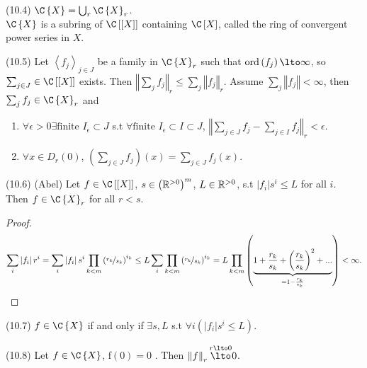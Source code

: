 \begin{definition*}
(10.4) $\C\left\{ X\right\} =\bigcup_{r}\C\left\{ X\right\} _{r}$.\\
$\C\left\{ X\right\} $ is a subring of $\C\left[\left[X\right]\right]$
containing $\C\left[X\right]$, called the ring of convergent power
series in $X$.\end{definition*}
\begin{exercise*}
(10.5) Let $\left\langle f_{j}\right\rangle _{j\in J}$ be a family
in $\C\left\{ X\right\} _{r}$ such that $\mathrm{ord}\left(f_{j}\right)\lto\infty$,
so $\sum_{j\in J}\in\C\left[\left[X\right]\right]$ exists. Then $\left\Vert \sum_{j}f_{j}\right\Vert _{r}\leq\sum_{j}\left\Vert f_{j}\right\Vert _{r}$.
Assume $\sum_{j}\left\Vert f_{j}\right\Vert <\infty$, then $\sum_{j}f_{j}\in\C\left\{ X\right\} _{r}$
and\end{exercise*}
\begin{enumerate}
\item $\forall\epsilon>0\exists\textrm{finite }I_{\epsilon}\subset J$ s.t
$\forall\textrm{finite }I_{\epsilon}\subset I\subset J$, $\left\Vert \sum_{j\in J}f_{j}-\sum_{j\in I}f_{j}\right\Vert _{r}<\epsilon$.
\item $\forall x\in D_{r}\left(0\right)$, $\left(\sum_{j\in J}f_{j}\right)\left(x\right)=\sum_{j\in J}f_{j}\left(x\right)$.\end{enumerate}
\begin{lemma*}
(10.6) (Abel) Let $f\in\C\left[\left[X\right]\right]$, $s\in\left(\mathbb{R}^{>0}\right)^{m}$,
$L\in\mathbb{R}^{>0}$, s.t $\left|f_{i}\right|s^{i}\leq L$ for all $i$.\\
Then $f\in\C\left\{ X\right\} _{r}$ for all $r<s$.\end{lemma*}
\begin{proof}
\[
\sum_{i}\left|f_{i}\right|r^{i}=\sum_{i}\left|f_{i}\right|s^{i}\prod_{k<m}\left(\nicefrac{r_{k}}{s_{k}}\right)^{i_{k}}\leq L\sum_{i}\prod_{k<m}\left(\nicefrac{r_{k}}{s_{k}}\right)^{i_{k}}=L\prod_{k<m}\left(\underbrace{1+\frac{r_{k}}{s_{k}}+\left(\frac{r_{k}}{s_{k}}\right)^{2}+...}_{=1-\frac{r_{k}}{s_{k}}}\right)<\infty.
\]
 \end{proof}
\begin{cor*}
(10.7) $f\in\C\left\{ X\right\} $ if and only if $\exists s,L$ s.t
$\forall i\left(\left|f_{i}\right|s^{i}\leq L\right)$.\end{cor*}
\begin{lemma*}
(10.8) Let $f\in\C\left\{ X\right\} $, f$\left(0\right)=0$ . Then
$\left\Vert f\right\Vert _{r}\overset{r\lto0}{\lto}0$.\end{lemma*}
